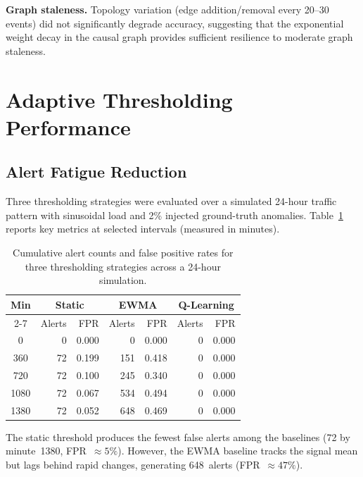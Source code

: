 \textbf{Graph staleness.} Topology variation (edge addition/removal every
20--30 events) did not significantly degrade accuracy, suggesting that the
exponential weight decay in the causal graph provides sufficient resilience
to moderate graph staleness.

\section{Adaptive Thresholding Performance}
\label{sec:eval_threshold}

\subsection{Alert Fatigue Reduction}
\label{subsec:eval_threshold_fatigue}

Three thresholding strategies were evaluated over a simulated 24-hour traffic
pattern with sinusoidal load and 2\% injected ground-truth anomalies.
Table~\ref{tab:threshold_fatigue} reports key metrics at selected intervals
(measured in minutes).

\begin{table}[H]
    \centering
    \begin{tabular}{|c|r|r|r|r|r|r|}
        \hline
        \textbf{Min} &
        \multicolumn{2}{c|}{\textbf{Static}} &
        \multicolumn{2}{c|}{\textbf{EWMA}} &
        \multicolumn{2}{c|}{\textbf{Q-Learning}} \\
        \cline{2-7}
        & Alerts & FPR & Alerts & FPR & Alerts & FPR \\
        \hline
        0 & 0 & 0.000 & 0 & 0.000 & 0 & 0.000 \\
        360 & 72 & 0.199 & 151 & 0.418 & 0 & 0.000 \\
        720 & 72 & 0.100 & 245 & 0.340 & 0 & 0.000 \\
        1080 & 72 & 0.067 & 534 & 0.494 & 0 & 0.000 \\
        1380 & 72 & 0.052 & 648 & 0.469 & 0 & 0.000 \\
        \hline
    \end{tabular}
    \caption{Cumulative alert counts and false positive rates for three
             thresholding strategies across a 24-hour simulation.}
    \label{tab:threshold_fatigue}
\end{table}

The static threshold produces the fewest false alerts among the baselines
(72 by minute~1380, FPR~$\approx 5\%$). However, the EWMA baseline tracks
the signal mean but lags behind rapid changes, generating 648~alerts
(FPR~$\approx 47\%$).

